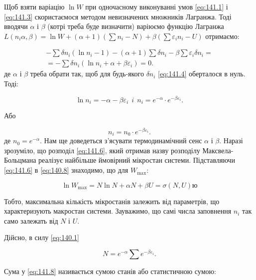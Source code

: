 Щоб взяти варіацію $\ln W$ при одночасному виконуванні умов \eqref{eq:141.1} і \eqref{eq:141.3} скористаємося методом невизначених множників Лагранжа. Тоді вводячи $\alpha$ і $\beta$ (котрі треба буде визначити) варіюємо функцію Лагранжа $L\left(n_i\alpha,\beta\right)=\ln{W+\left(\alpha+1\right)\left(\sum n_i-N\right)+\beta\left(\sum{\varepsilon_in_i-U}\right)}$ отримаємо:

\begin{multline}\label{eq:141.4}
	-\sum\delta n_i(\ln{n_i}-1)-\left(\alpha+1\right)\sum\delta n_i-\beta\sum\varepsilon_i\delta n_i=\\=-\sum\delta n_i\left(\ln{n_i}+\alpha+\beta\varepsilon_i\right)=0.
\end{multline}
%
де $\alpha$ і $\beta$ треба обрати так, щоб для будь-якого $\delta n_i$ \eqref{eq:141.4} оберталося в нуль. Тоді:

\begin{equation}
	\ln{n_i}=-\alpha-\beta\varepsilon_i\ \ i\ \ n_i=e^{-\alpha}\cdot e^{-\beta\varepsilon_i}.
	\label{eq:141.5}
\end{equation}

Або

\begin{equation}
	n_i=n_0\cdot e^{-\beta\varepsilon_i}.
	\label{eq:141.6}
\end{equation}
%
де $n_0 = e^{-\alpha}$. Нам ще доведеться з’ясувати термодинамічний сенс $\alpha$ і $\beta$. Наразі зрозуміло, що розподіл \eqref{eq:141.6}, який отримав назву розподілу Максвела-Больцмана реалізує найбільше ймовірний мікростан системи. Підставляючи \eqref{eq:141.6} в \eqref{eq:140.8} знаходимо, що для $W_{\max}$:

\begin{equation}
	\ln{W_{\max}}=N\ln{N}+\alpha N+\beta U=\sigma\left(N,U\right)ю
	\label{eq:141.7}
\end{equation}

Тобто, максимальна кількість мікростанів залежить від параметрів, що характеризують макростан системи. Зауважимо, що самі числа заповнення $n_i$ так само залежать від $N$ і $U$.

Дійсно, в силу \eqref{eq:140.1}

\begin{equation}
	N=e^{-\alpha}\sum e^{-\beta\varepsilon_i}.
	\label{eq:141.8}
\end{equation}

Сума у \eqref{eq:141.8} називається сумою станів або статистичною сумою:

